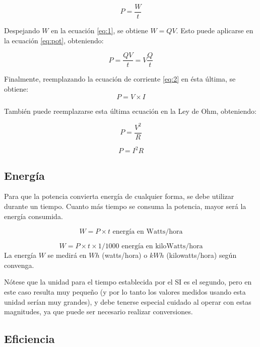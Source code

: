 \begin{equation}
	\label{eq:pot}
	P = \frac{W}{t}
\end{equation}

Despejando $W$ en la ecuación \ref{eq:1}, se obtiene $ W=QV $. Esto puede aplicarse en la ecuación \ref{eq:pot}, obteniendo:

$$ P =\frac{QV}{t}=V\frac{Q}{t} $$

Finalmente, reemplazando la ecuación de corriente \ref{eq:2} en ésta última, se obtiene:
\begin{equation}
	\label{eq:pot_cc1}
	P = V \times I
\end{equation}

También puede reemplazarse esta última ecuación en la Ley de Ohm, obteniendo:

\begin{equation}
	\label{eq:pot_cc2}
	P = \frac{V^{2}}{R}
\end{equation}

\begin{equation}
	\label{eq:pot_cc3}
	P = I^{2}R
\end{equation}

\subsection{Energía}

Para que la potencia convierta energía de cualquier forma, se debe utilizar durante un tiempo. Cuanto más tiempo se consuma la potencia, mayor será la energía consumida.

\begin{equation}
	\label{eq:w}
	W=P\times t \text{ energía en Watts/hora}
\end{equation}

\begin{equation}
	\label{eq:w_kwh}
	W=P\times t \times 1/1000 \text{ energía en kiloWatts/hora}
\end{equation}
La energía $W$ se medirá en $Wh$ (watts/hora) o $kWh$ (kilowatts/hora) según convenga.

Nótese que la unidad para el tiempo establecida por el SI es el segundo, pero en este caso resulta muy pequeño (y por lo tanto los valores medidos usando esta unidad serían muy grandes), y debe tenerse especial cuidado al operar con estas magnitudes, ya que puede ser necesario realizar conversiones.

\subsection{Eficiencia}

